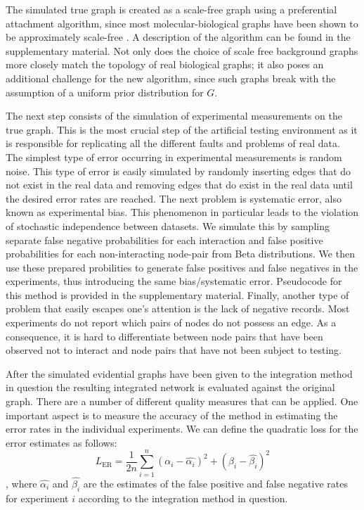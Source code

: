 \documentclass{bioinfo}
\begin{document}
\begin{methods}
The simulated true graph is created as a scale-free graph using a preferential attachment algorithm, since most molecular-biological graphs have been shown to be approximately scale-free \citep{jeong_lethality_2001, eisenberg_preferential_2003}. A description of the algorithm can be found in the supplementary material.
Not only does the choice of scale free background graphs more closely match the topology of real biological graphs; it also poses an additional challenge for the new algorithm, since such graphs break with the assumption of a uniform prior distribution for $G$.

The next step consists of the simulation of experimental measurements on the true graph. This is the most crucial step of the artificial testing environment as it is responsible for replicating all the different faults and problems of real data. The simplest type of error occurring in experimental measurements is random noise. This type of error is easily simulated by randomly inserting edges that do not exist in the real data and removing edges that do exist in the real data until the desired error rates are reached. The next problem is systematic error, also known as experimental bias. This phenomenon in particular leads to the violation of stochastic independence between datasets. We simulate this by sampling separate false negative probabilities for each interaction and false positive probabilities for each non-interacting node-pair from Beta distributions. We then use these prepared probilities to generate false positives and false negatives in the experiments, thus introducing the same bias/systematic error. Pseudocode for this method is provided in the supplementary material.
Finally, another type of problem that easily escapes one's attention is the lack of negative records. Most experiments do not report which pairs of nodes do not possess an edge. As a consequence, it is hard to differentiate between node pairs that have been observed not to interact and node pairs that have not been subject to testing. 

After the simulated evidential graphs have been given to the integration method in question the resulting integrated network is evaluated against the original graph. There are a number of different quality measures that can be applied. One important aspect is to measure the accuracy of the method in estimating the error rates in the individual experiments. We can define the quadratic loss for the error estimates as follows:
\begin{equation}
  L_\text{ER} = \frac{1}{2n}\sum_{i=1}^n (\alpha_i - \hat{\alpha_i})^2 + (\beta_i - \hat{\beta_i})^2
\end{equation},
where $\hat{\alpha_i}$ and $\hat{\beta_i}$ are the estimates of the false positive and false negative rates for experiment $i$ according to the integration method in question.


\end{methods}
\end{document}
